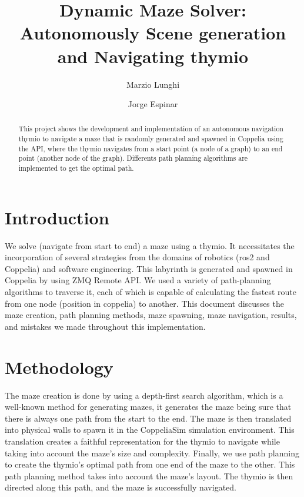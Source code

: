 \documentclass[12pt, a4paper, twocolumn]{article}
\title{\textbf{Dynamic Maze Solver: Autonomously Scene generation and Navigating thymio}}
\author{Marzio Lunghi \and Jorge Espinar}
\begin{document}
\twocolumn
\maketitle
\begin{abstract}
This project shows the development and implementation of an autonomous navigation thymio to navigate a maze that is randomly generated and spawned in Coppelia using the API, where the thymio navigates from a start point (a node of a graph) to an end point (another node of the graph). Differents path planning algorithms are implemented to get the optimal path.
\end{abstract}

\section{Introduction}
We solve (navigate from start to end) a maze using a thymio. It necessitates the incorporation of several strategies from the domains of robotics (ros2 and Coppelia) and software engineering. This labyrinth is generated and spawned in Coppelia by using ZMQ Remote API. We used a variety of path-planning algorithms to traverse it, each of which is capable of calculating the fastest route from one node (position in coppelia) to another. This document discusses the maze creation, path planning methods, maze spawning, maze navigation, results, and mistakes we made throughout this implementation.

\section{Methodology}

The maze creation is done by using a depth-first search algorithm, which is a well-known method for generating mazes, it generates the maze being sure that there is always one path from the start to the end. The maze is then translated into physical walls to spawn it in the CoppeliaSim simulation environment. This translation creates a faithful representation for the thymio to navigate while taking into account the maze's size and complexity. Finally, we use path planning to create the thymio's optimal path from one end of the maze to the other. This path planning method takes into account the maze's layout.  The thymio is then directed along this path, and the maze is successfully navigated.
\end{document}
